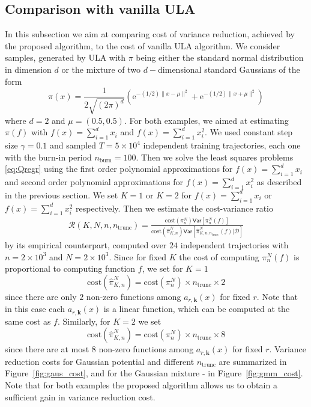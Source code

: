 \documentclass[bj]{imsart}
\def\PVar{\mathsf{Var}}
\def\rme{\mathrm{e}}
\def\NtrainPath{T}
\def\TrainSet{\mathcal{D}}
\begin{document}
\subsection{Comparison with vanilla ULA}
In this subsection we aim at comparing cost of variance reduction, achieved by the proposed algorithm, to the cost of vanilla ULA algorithm. We consider samples, generated by ULA with $\pi$ being either the standard normal distribution in dimension $d$ or the mixture of two $d-$dimensional standard Gaussians of the form
 \[
 \pi(x) = \frac{1}{2\sqrt{(2\pi)^{d}}} \left( \rme^{-(1/2)\|x-\mu\|^2} + \rme^{-(1/2)\|x+\mu\|^2}\right)
 \]
 where $d = 2$ and $\mu = (0.5,0.5)$. For both examples, we aimed at estimating $\pi(f)$ with $f(x)=\sum_{i=1}^d x_i$ and $f(x) = \sum_{i=1}^d x^2_i$. We used constant step size $\gamma=0.1$ and sampled $\NtrainPath = 5 \times 10^4$ independent training trajectories, each one with the burn-in period $n_{\text{burn}} = 100$. Then we solve the least squares  problems \eqref{eq:Qregr} using the first order polynomial approximations for $f(x)=\sum_{i=1}^d x_i$ and second order polynomial approximations for $f(x) = \sum_{i=1}^d x^2_i$ as described in the previous section. We set $K=1$ or $K=2$ for $f(x)=\sum_{i=1}^d x_i$ or $f(x)=\sum_{i=1}^d x^2_i$ respectively. Then we estimate the cost-variance ratio
\begin{eqnarray}
\label{eq:cvR}
\mathcal{R}(K,N,n,n_{\mathrm{trunc}})=\frac{\mathrm{cost}(\pi_{n}^N)\PVar[\pi_{n}^N(f)]}{\mathrm{cost}(\widehat \pi_{K,n}^N) \PVar[\widehat \pi_{K,n,n_{\mathrm{trunc}} }^N(f)|\TrainSet]}
\end{eqnarray}
by its empirical counterpart, computed over $24$ independent trajectories with $n = 2\times 10^3$ and $N = 2 \times 10^3$. Since for fixed $K$ the cost of computing $\pi_{n}^N(f)$ is proportional to computing function $f$, we set for $K = 1$
 \begin{equation*}
 \mathrm{cost}(\widehat \pi_{K,n}^N) = \mathrm{cost}(\pi_{n}^N) \times n_{\mathrm{trunc}} \times 2
 \end{equation*}
 since there are only $2$ non-zero functions among $a_{r,\mathbf{k}}(x)$ for fixed $r$. Note that in this case each $a_{r,\mathbf{k}}(x)$  is a linear function, which can be computed at the same cost as $f$. Similarly, for $K = 2$ we set
  \begin{equation*}
 \mathrm{cost}(\widehat \pi_{K,n}^N) = \mathrm{cost}(\pi_{n}^N) \times n_{\mathrm{trunc}} \times 8
 \end{equation*}
since there are at most $8$ non-zero functions among $a_{r,\mathbf{k}}(x)$ for fixed $r$. Variance reduction costs for Gaussian potential and different $n_{\mathrm{trunc}}$  are summarized in Figure~\ref{fig:gaus_cost}, and for the Gaussian mixture - in Figure~\ref{fig:gmm_cost}. Note that for both examples the proposed algorithm allows us to obtain a sufficient gain in variance reduction cost.
\end{document}
